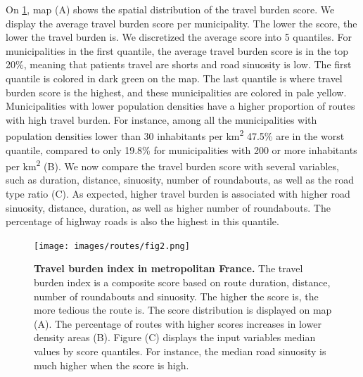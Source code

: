 On \cref{fig:routes-burden-index}, map (A) shows the spatial distribution
of the travel burden score. We display the average travel burden score per
municipality. The lower the score, the lower the travel burden is. We
discretized the average score into 5 quantiles. For municipalities in the first
quantile, the average travel burden score is in the top 20\%, meaning that
patients travel are shorts and road sinuosity is low. The first quantile is
colored in dark green on the map. The last quantile is where travel burden score
is the highest, and these municipalities are colored in pale yellow.
Municipalities with lower population densities have a higher proportion of
routes with high travel burden. For instance, among all the municipalities with
population densities lower than 30 inhabitants per km\textsuperscript{2} 47.5\%
are in the worst quantile, compared to only 19.8\% for municipalities with 200
or more inhabitants per km\textsuperscript{2} (B). We now compare the travel
burden score with several variables, such as duration, distance, sinuosity,
number of roundabouts, as well as the road type ratio (C). As expected, higher
travel burden is associated with higher road sinuosity, distance, duration, as
well as higher number of roundabouts. The percentage of highway roads is also
the highest in this quantile.

\begin{figure}[h!]
    \texttt{[image: images/routes/fig2.png]}
    \centering
    \caption{
        \textbf{Travel burden index in metropolitan France.}
        The travel burden index is a composite score based on route duration,
        distance, number of roundabouts and sinuosity. The higher the score is,
        the more tedious the route is. The score distribution is displayed on
        map (A). The percentage of routes with higher scores increases in lower
        density areas (B). Figure (C) displays the input variables median values
        by score quantiles. For instance, the median road sinuosity is much
        higher when the score is high. }
    \label{fig:routes-burden-index}
\end{figure}

